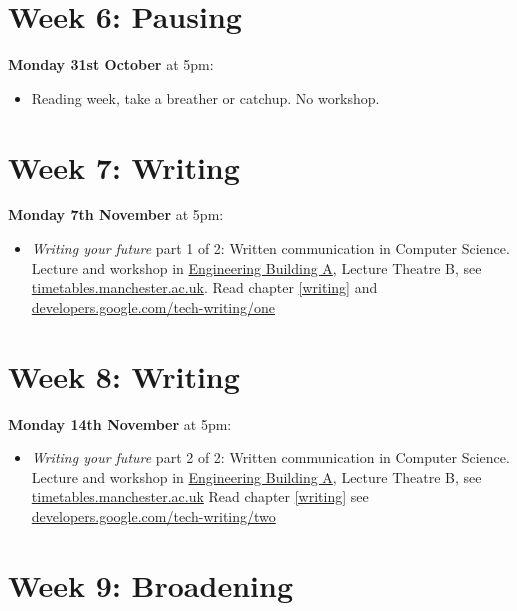 \documentclass[
]{book}
\providecommand{\tightlist}{%
  \setlength{\itemsep}{0pt}\setlength{\parskip}{0pt}}
\begin{document}
\hypertarget{week6}{%
\section{Week 6: Pausing}\label{week6}}

\textbf{Monday 31st October} at 5pm:

\begin{itemize}
\tightlist
\item
  Reading week, take a breather or catchup. No workshop.
\end{itemize}

\hypertarget{week7}{%
\section{Week 7: Writing}\label{week7}}

\textbf{Monday 7th November} at 5pm:

\begin{itemize}
\tightlist
\item
  \emph{Writing your future} part 1 of 2: Written communication in Computer Science. Lecture and workshop in \href{https://www.manchester.ac.uk/discover/maps/interactive-map/?id=540}{Engineering Building A}, Lecture Theatre B, see \href{https://timetables.manchester.ac.uk/}{timetables.manchester.ac.uk}. Read chapter \ref{writing} and \href{https://developers.google.com/tech-writing/one}{developers.google.com/tech-writing/one}
\end{itemize}

\hypertarget{week8}{%
\section{Week 8: Writing}\label{week8}}

\textbf{Monday 14th November} at 5pm:

\begin{itemize}
\tightlist
\item
  \emph{Writing your future} part 2 of 2: Written communication in Computer Science. Lecture and workshop in \href{https://www.manchester.ac.uk/discover/maps/interactive-map/?id=540}{Engineering Building A}, Lecture Theatre B, see \href{https://timetables.manchester.ac.uk/}{timetables.manchester.ac.uk} Read chapter \ref{writing} see \href{https://developers.google.com/tech-writing/two}{developers.google.com/tech-writing/two}
\end{itemize}

\hypertarget{week9}{%
\section{Week 9: Broadening}\label{week9}}
\end{document}
